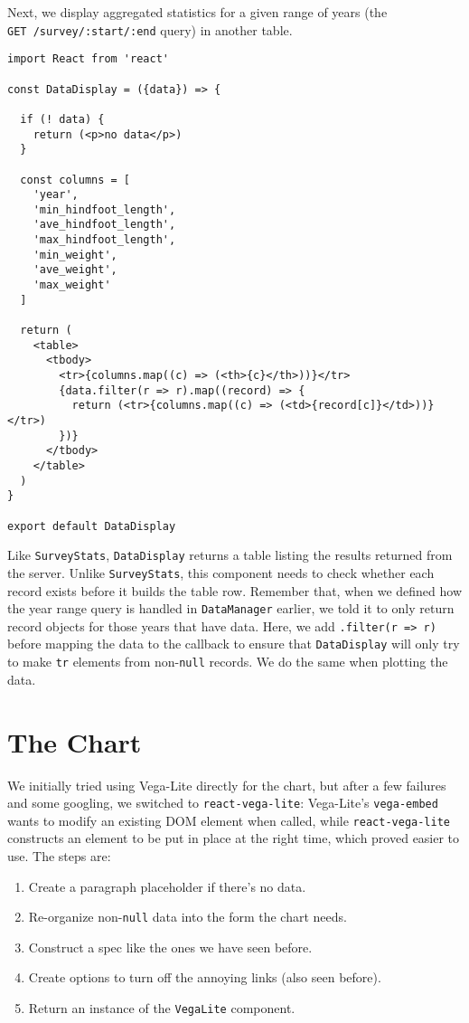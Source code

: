 Next, we display aggregated statistics for a given range of years
(the \texttt{GET\ /survey/:start/:end} query)
in another table.

\begin{verbatim}
import React from 'react'

const DataDisplay = ({data}) => {

  if (! data) {
    return (<p>no data</p>)
  }

  const columns = [
    'year',
    'min_hindfoot_length',
    'ave_hindfoot_length',
    'max_hindfoot_length',
    'min_weight',
    'ave_weight',
    'max_weight'
  ]

  return (
    <table>
      <tbody>
        <tr>{columns.map((c) => (<th>{c}</th>))}</tr>
        {data.filter(r => r).map((record) => {
          return (<tr>{columns.map((c) => (<td>{record[c]}</td>))}</tr>)
        })}
      </tbody>
    </table>
  )
}

export default DataDisplay
\end{verbatim}

Like \texttt{SurveyStats}, \texttt{DataDisplay} returns a table listing the results returned from the server.
Unlike \texttt{SurveyStats},
this component needs to check whether each record exists before it builds the table row.
Remember that,
when we defined how the year range query is handled in \texttt{DataManager} earlier,
we told it to only return record objects for those years that have data.
Here, we add \texttt{.filter(r\ =\textgreater{}\ r)} before mapping the data to the callback
to ensure that \texttt{DataDisplay} will only try to make \texttt{tr} elements from non-\texttt{null} records.
We do the same when plotting the data.

\section{The Chart}\label{s:capstone-chart}

We initially tried using Vega-Lite directly for the chart,
but after a few failures and some googling,
we switched to \texttt{react-vega-lite}:
Vega-Lite's \texttt{vega-embed} wants to modify an existing DOM element when called,
while \texttt{react-vega-lite} constructs an element to be put in place at the right time,
which proved easier to use.
The steps are:

\begin{enumerate}
\item
  Create a paragraph placeholder if there's no data.
\item
  Re-organize non-\texttt{null} data into the form the chart needs.
\item
  Construct a spec like the ones we have seen before.
\item
  Create options to turn off the annoying links (also seen before).
\item
  Return an instance of the \texttt{VegaLite} component.
\end{enumerate}

